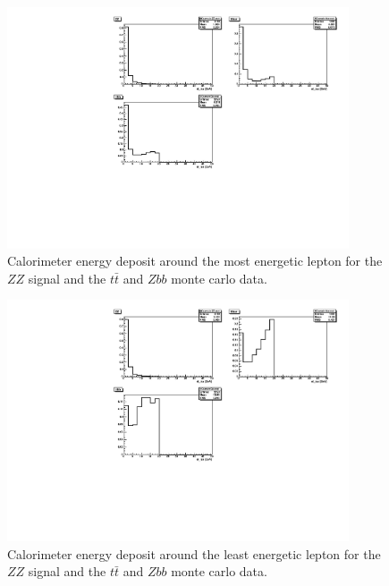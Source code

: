 \documentclass[twoside,        %
               BCOR12mm,       %
               ngerman,english, %
               fleqn,headsepline=false,footsepline=false
              ]{Vorlage/MFPREPORT}
\begin{document}
\begin{figure}[h!]
    \begin{center}
        \includegraphics[width=0.9\textwidth]{ZZ/etiso1_uncut}
    \end{center}
    \caption{Calorimeter energy deposit around the most energetic lepton for
    the $ZZ$ signal and the $t\bar t$ and $Zbb$
    monte carlo data.}
    \label{fig:cut2}
\end{figure}
\begin{figure}[h!]
    \begin{center}
        \includegraphics[width=0.9\textwidth]{ZZ/etiso4_uncut}
    \end{center}
    \caption{Calorimeter energy deposit around the least energetic lepton for
    the $ZZ$ signal and the $t\bar t$ and $Zbb$
    monte carlo data.}
    \label{fig:cut3}
\end{figure}
\end{document}
